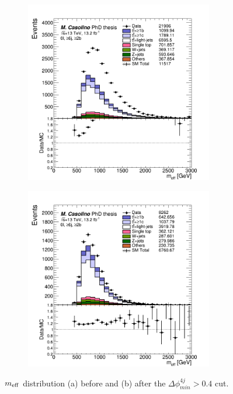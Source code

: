 \begin{figure}[t!]
\begin{subfigure}{0.5\textwidth}
  \centering
  \includegraphics[width=0.9\textwidth]{figures/VLQ/canv_c0l2b_meff_nodPhi.png}
  \caption{}
  \label{}
\end{subfigure}
\begin{subfigure}{0.5\textwidth}
  \centering
  \includegraphics[width=0.9\textwidth]{figures/VLQ/canv_c0l2b_meff_afterdPhi.png}
  \caption{}
  \label{}
\end{subfigure}
\captionsetup{width=0.85\textwidth} \caption{\small $m_{\rm eff}$ distribution (a) before and (b) after the $\Delta \phi_{min}^{4j}>0.4$ cut.}
\label{sec:vlq:fig:dphimeff}
\end{figure}



